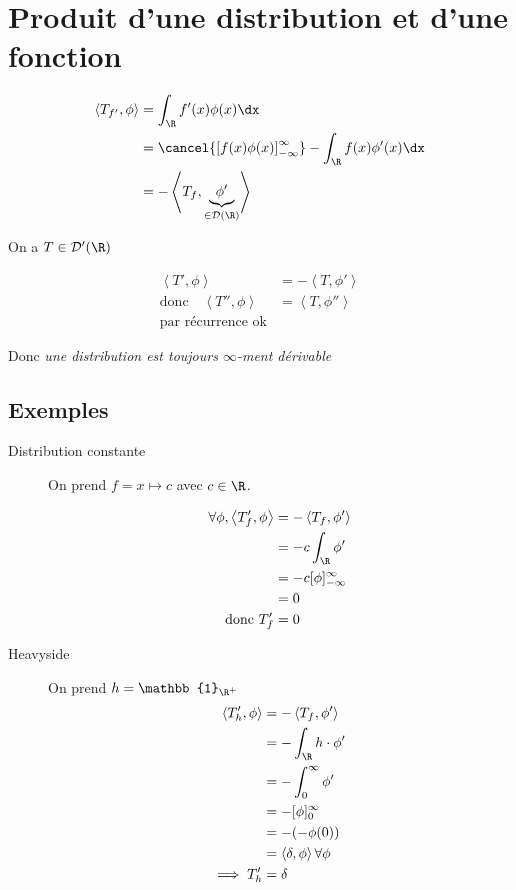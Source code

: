


	\section{Produit d'une distribution et d'une fonction}

	\begin{align*}
		\left<T_{f'}, \phi \right> &= \int_\R f'(x) \phi(x) \dx \\
					   &= \cancel{\left[ f(x) \phi(x) \right]_{-\infty}^\infty} - \int_\R f(x) \phi'(x) \dx \\
					   &= -\left<T_f, \underbrace{\phi'}_{\in \mathcal{D}(\R)} \right>\\
	\end{align*}

	On a $T \in \mathcal{D}'(\R)$

	\begin{align*}
		\left<T', \phi \right> &=  -\left<T, \phi' \right> \\
		\text{donc}\quad \left<T'', \phi \right> &= \left<T, \phi'' \right> \\
		\text{par récurrence ok}
	\end{align*}

	Donc \emph{une distribution est toujours $\infty$-ment dérivable} 

	\subsection{Exemples}
	\begin{description}
		\item[Distribution constante] 
			On prend $f = x\mapsto c$ avec $c \in \R$.

			\begin{align*}
				\forall \phi, \left<T_f', \phi \right> &= -\left<T_f, \phi' \right> \\
				&= -c \int_\R \phi' \\
				&= -c [\phi]_{-\infty}^\infty \\
				&= 0 \\
			\text{donc } T_f' &= 0 \\
			\end{align*}
		\item[Heavyside] 
			On prend $h = \mathbb{1}_{\R^+}$
			\begin{align*}
				\left<T_h', \phi \right> &=  - \left<T_f, \phi' \right>\\
				&= -\int_{\R} h \cdot \phi' \\
				&= -\int_0^\infty \phi' \\
				&= -[\phi]_0^\infty \\
				&=  -(-\phi(0))\\
				&= \left<\delta, \phi \right> \forall \phi \\
			\implies T_h' &= \delta \\
			\end{align*}
	\end{description}

